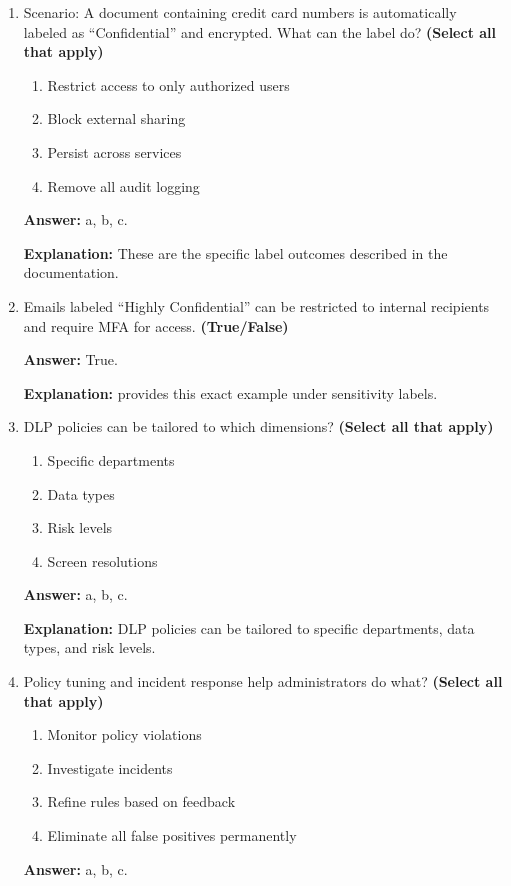 \documentclass[10pt]{article}
\begin{document}
\begin{enumerate}[leftmargin=*]
\item Scenario: A document containing credit card numbers is automatically labeled as ``Confidential'' and encrypted. What can the label do? \textbf{(Select all that apply)}
\begin{enumerate}[label=\alph*., leftmargin=1.5em]
\item Restrict access to only authorized users
\item Block external sharing
\item Persist across services
\item Remove all audit logging
\end{enumerate}
\textbf{Answer:} a, b, c.

\textbf{Explanation:} These are the specific label outcomes described in the documentation.

\item Emails labeled ``Highly Confidential'' can be restricted to internal recipients and require MFA for access. \textbf{(True/False)}

\textbf{Answer:} True.

\textbf{Explanation:} provides this exact example under sensitivity labels.

\item DLP policies can be tailored to which dimensions? \textbf{(Select all that apply)}
\begin{enumerate}[label=\alph*., leftmargin=1.5em]
\item Specific departments
\item Data types
\item Risk levels
\item Screen resolutions
\end{enumerate}
\textbf{Answer:} a, b, c.

\textbf{Explanation:} DLP policies can be tailored to specific departments, data types, and risk levels.

\item Policy tuning and incident response help administrators do what? \textbf{(Select all that apply)}
\begin{enumerate}[label=\alph*., leftmargin=1.5em]
\item Monitor policy violations
\item Investigate incidents
\item Refine rules based on feedback
\item Eliminate all false positives permanently
\end{enumerate}
\textbf{Answer:} a, b, c.


\end{enumerate}
\end{document}
